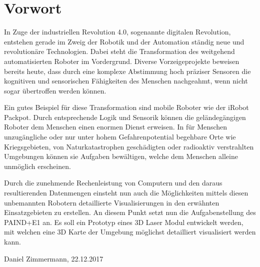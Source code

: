 \chapter*{Vorwort}
\label{chap:Vorwort}

In Zuge der industriellen Revolution 4.0, sogenannte digitalen Revolution, entstehen gerade im Zweig der Robotik und der Automation ständig neue und revolutionäre Technologien. Dabei steht die Transformation des weitgehend automatisierten Roboter im Vordergrund. Diverse Vorzeigeprojekte beweisen bereits heute, dass durch eine komplexe Abstimmung hoch präziser Sensoren die kognitiven und sensorischen Fähigkeiten des Menschen nachgeahmt, wenn nicht sogar übertroffen werden können.

Ein gutes Beispiel für diese Transformation sind mobile Roboter wie der iRobot Packpot. Durch entsprechende Logik und Sensorik können die geländegängigen Roboter dem Menschen einen enormen Dienst erweisen. In für Menschen unzugängliche oder nur unter hohem Gefahrenpotential begehbare Orte wie Kriegsgebieten, von Naturkatastrophen geschädigten oder radioaktiv verstrahlten Umgebungen können sie Aufgaben bewältigen, welche dem Menschen alleine unmöglich erscheinen.

Durch die zunehmende Rechenleistung von Computern und den daraus resultierenden Datenmengen einsteht nun auch die Möglichkeiten mittels diesen unbemannten Robotern detaillierte Visualisierungen in den erwähnten Einsatzgebieten zu erstellen. An diesem Punkt setzt nun die Aufgabenstellung des PAIND+E1 an. Es soll ein Prototyp eines 3D Laser Modul entwickelt werden, mit welchen eine 3D Karte der Umgebung möglichst detailliert visualisiert werden kann.

Daniel Zimmermann, 22.12.2017









 






